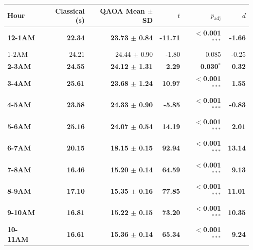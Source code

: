 \documentclass[12pt]{article}
\begin{document}
\begin{table}[H]
\begin{tabular}{lrrrrr}
\toprule
Hour & Classical (s) & QAOA Mean $\pm$ SD & $t$ & $p_{\text{adj}}$ & $d$ \\
\midrule
{\boldmath\bfseries 12-1AM} & {\boldmath\bfseries 22.34} & {\boldmath\bfseries 23.73 $\pm$ 0.84} & {\boldmath\bfseries -11.71} & {\boldmath\bfseries $<$0.001$^{***}$} & {\boldmath\bfseries -1.66} \\
1-2AM & 24.21 & 24.44 $\pm$ 0.90 & -1.80 & 0.085 & -0.25 \\
{\boldmath\bfseries 2-3AM} & {\boldmath\bfseries 24.55} & {\boldmath\bfseries 24.12 $\pm$ 1.31} & {\boldmath\bfseries 2.29} & {\boldmath\bfseries 0.030$^{*}$} & {\boldmath\bfseries 0.32} \\
{\boldmath\bfseries 3-4AM} & {\boldmath\bfseries 25.61} & {\boldmath\bfseries 23.68 $\pm$ 1.24} & {\boldmath\bfseries 10.97} & {\boldmath\bfseries $<$0.001$^{***}$} & {\boldmath\bfseries 1.55} \\
{\boldmath\bfseries 4-5AM} & {\boldmath\bfseries 23.58} & {\boldmath\bfseries 24.33 $\pm$ 0.90} & {\boldmath\bfseries -5.85} & {\boldmath\bfseries $<$0.001$^{***}$} & {\boldmath\bfseries -0.83} \\
{\boldmath\bfseries 5-6AM} & {\boldmath\bfseries 25.16} & {\boldmath\bfseries 24.07 $\pm$ 0.54} & {\boldmath\bfseries 14.19} & {\boldmath\bfseries $<$0.001$^{***}$} & {\boldmath\bfseries 2.01} \\
{\boldmath\bfseries 6-7AM} & {\boldmath\bfseries 20.15} & {\boldmath\bfseries 18.15 $\pm$ 0.15} & {\boldmath\bfseries 92.94} & {\boldmath\bfseries $<$0.001$^{***}$} & {\boldmath\bfseries 13.14} \\
{\boldmath\bfseries 7-8AM} & {\boldmath\bfseries 16.46} & {\boldmath\bfseries 15.20 $\pm$ 0.14} & {\boldmath\bfseries 64.59} & {\boldmath\bfseries $<$0.001$^{***}$} & {\boldmath\bfseries 9.13} \\
{\boldmath\bfseries 8-9AM} & {\boldmath\bfseries 17.10} & {\boldmath\bfseries 15.35 $\pm$ 0.16} & {\boldmath\bfseries 77.85} & {\boldmath\bfseries $<$0.001$^{***}$} & {\boldmath\bfseries 11.01} \\
{\boldmath\bfseries 9-10AM} & {\boldmath\bfseries 16.81} & {\boldmath\bfseries 15.22 $\pm$ 0.15} & {\boldmath\bfseries 73.20} & {\boldmath\bfseries $<$0.001$^{***}$} & {\boldmath\bfseries 10.35} \\
{\boldmath\bfseries 10-11AM} & {\boldmath\bfseries 16.61} & {\boldmath\bfseries 15.36 $\pm$ 0.14} & {\boldmath\bfseries 65.34} & {\boldmath\bfseries $<$0.001$^{***}$} & {\boldmath\bfseries 9.24} \\

\end{tabular}
\end{table}
\end{document}

